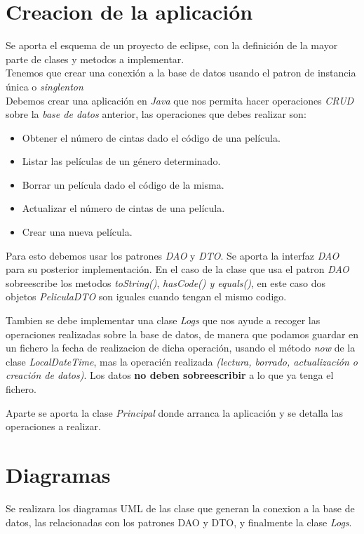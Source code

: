 \documentclass[4paper]{article}
\begin{document}
\section*{Creacion de la aplicación}
Se aporta el esquema de un proyecto de eclipse, con la definición de la mayor parte de clases y metodos a implementar.\\
Tenemos que crear una conexión a la base de datos usando el patron de instancia única o \emph{singlenton} \\
Debemos crear una aplicación en \emph{Java} que nos permita hacer operaciones \emph{CRUD} sobre la \emph{base de datos} anterior, las operaciones que debes realizar son:
\begin{itemize}
\item Obtener el número de cintas dado el código de una película.
\item Listar las películas de un género determinado.
\item Borrar un película dado el código de la misma.
\item Actualizar el número de cintas de una película.
\item Crear una nueva película.
\end{itemize}
Para esto debemos usar los patrones \emph{DAO} y \emph{DTO}. Se aporta la interfaz \emph{DAO} para su posterior implementación. En el caso de la clase que usa el patron \emph{DAO} sobreescribe los metodos \emph{toString()}, \emph{hasCode() y equals()}, en este caso dos objetos \emph{PeliculaDTO} son iguales cuando tengan el mismo codigo.
\par 
Tambien se debe implementar una clase \emph{Logs} que nos ayude a recoger las operaciones realizadas sobre la base de datos, de manera que podamos guardar en un fichero la fecha de realizacion de dicha operación, usando el método \emph{now} de la clase \emph{LocalDateTime}, mas la operacién realizada \emph{(lectura, borrado, actualización o creación de datos)}. Los datos \textbf{no deben sobreescribir} a lo que ya tenga el fichero.\par
Aparte se aporta la clase \emph{Principal} donde arranca la aplicación y se detalla las operaciones a realizar.

\section*{Diagramas}
Se realizara los diagramas UML de las clase que generan la conexion a la base de datos, las relacionadas con los patrones DAO y DTO, y finalmente la clase \emph{Logs}.
\end{document}
